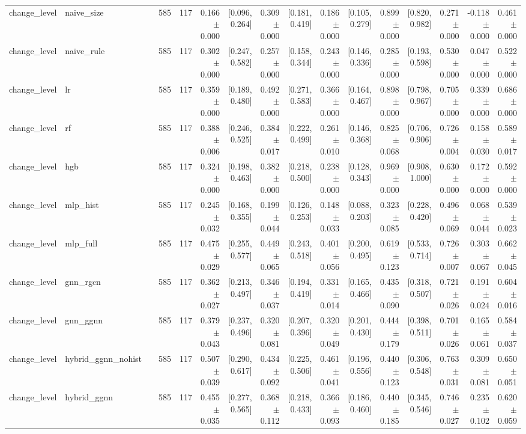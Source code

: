 \begin{table}[htbp]
{\begin{tabular}{llrrrrrrrrrrrrrr}
change\_level & naive\_size &  & 585 & 117 & 0.166 $\pm$ 0.000 & [0.096, 0.264] & 0.309 $\pm$ 0.000 & [0.181, 0.419] & 0.186 $\pm$ 0.000 & [0.105, 0.279] & 0.899 $\pm$ 0.000 & [0.820, 0.982] & 0.271 $\pm$ 0.000 & -0.118 $\pm$ 0.000 & 0.461 $\pm$ 0.000 \\
change\_level & naive\_rule &  & 585 & 117 & 0.302 $\pm$ 0.000 & [0.247, 0.582] & 0.257 $\pm$ 0.000 & [0.158, 0.344] & 0.243 $\pm$ 0.000 & [0.146, 0.336] & 0.285 $\pm$ 0.000 & [0.193, 0.598] & 0.530 $\pm$ 0.000 & 0.047 $\pm$ 0.000 & 0.522 $\pm$ 0.000 \\
change\_level & lr &  & 585 & 117 & 0.359 $\pm$ 0.000 & [0.189, 0.480] & 0.492 $\pm$ 0.000 & [0.271, 0.583] & 0.366 $\pm$ 0.000 & [0.164, 0.467] & 0.898 $\pm$ 0.000 & [0.798, 0.967] & 0.705 $\pm$ 0.000 & 0.339 $\pm$ 0.000 & 0.686 $\pm$ 0.000 \\
change\_level & rf &  & 585 & 117 & 0.388 $\pm$ 0.006 & [0.246, 0.525] & 0.384 $\pm$ 0.017 & [0.222, 0.499] & 0.261 $\pm$ 0.010 & [0.146, 0.368] & 0.825 $\pm$ 0.068 & [0.706, 0.906] & 0.726 $\pm$ 0.004 & 0.158 $\pm$ 0.030 & 0.589 $\pm$ 0.017 \\
change\_level & hgb &  & 585 & 117 & 0.324 $\pm$ 0.000 & [0.198, 0.463] & 0.382 $\pm$ 0.000 & [0.218, 0.500] & 0.238 $\pm$ 0.000 & [0.128, 0.343] & 0.969 $\pm$ 0.000 & [0.908, 1.000] & 0.630 $\pm$ 0.000 & 0.172 $\pm$ 0.000 & 0.592 $\pm$ 0.000 \\
change\_level & mlp\_hist &  & 585 & 117 & 0.245 $\pm$ 0.032 & [0.168, 0.355] & 0.199 $\pm$ 0.044 & [0.126, 0.253] & 0.148 $\pm$ 0.033 & [0.088, 0.203] & 0.323 $\pm$ 0.085 & [0.228, 0.420] & 0.496 $\pm$ 0.069 & 0.068 $\pm$ 0.044 & 0.539 $\pm$ 0.023 \\
change\_level & mlp\_full &  & 585 & 117 & 0.475 $\pm$ 0.029 & [0.255, 0.577] & 0.449 $\pm$ 0.065 & [0.243, 0.518] & 0.401 $\pm$ 0.056 & [0.200, 0.495] & 0.619 $\pm$ 0.123 & [0.533, 0.714] & 0.726 $\pm$ 0.007 & 0.303 $\pm$ 0.067 & 0.662 $\pm$ 0.045 \\
change\_level & gnn\_rgcn &  & 585 & 117 & 0.362 $\pm$ 0.027 & [0.213, 0.497] & 0.346 $\pm$ 0.037 & [0.194, 0.419] & 0.331 $\pm$ 0.014 & [0.165, 0.466] & 0.435 $\pm$ 0.090 & [0.318, 0.507] & 0.721 $\pm$ 0.026 & 0.191 $\pm$ 0.024 & 0.604 $\pm$ 0.016 \\
change\_level & gnn\_ggnn &  & 585 & 117 & 0.379 $\pm$ 0.043 & [0.237, 0.496] & 0.320 $\pm$ 0.081 & [0.207, 0.396] & 0.320 $\pm$ 0.049 & [0.201, 0.430] & 0.444 $\pm$ 0.179 & [0.398, 0.511] & 0.701 $\pm$ 0.026 & 0.165 $\pm$ 0.061 & 0.584 $\pm$ 0.037 \\
change\_level & hybrid\_ggnn\_nohist &  & 585 & 117 & 0.507 $\pm$ 0.039 & [0.290, 0.617] & 0.434 $\pm$ 0.092 & [0.225, 0.506] & 0.461 $\pm$ 0.041 & [0.196, 0.556] & 0.440 $\pm$ 0.123 & [0.306, 0.548] & 0.763 $\pm$ 0.031 & 0.309 $\pm$ 0.081 & 0.650 $\pm$ 0.051 \\
change\_level & hybrid\_ggnn &  & 585 & 117 & 0.455 $\pm$ 0.035 & [0.277, 0.565] & 0.368 $\pm$ 0.112 & [0.218, 0.433] & 0.366 $\pm$ 0.093 & [0.186, 0.460] & 0.440 $\pm$ 0.185 & [0.345, 0.546] & 0.746 $\pm$ 0.027 & 0.235 $\pm$ 0.102 & 0.620 $\pm$ 0.059 \\
\bottomrule
\end{tabular}}
\end{table}
